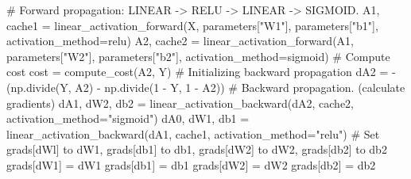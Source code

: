 \documentclass[
  letterpaper,
  DIV=11,
  numbers=noendperiod]{scrartcl}
\newenvironment{Shaded}{\begin{snugshade}}{\end{snugshade}}
\newcommand{\CommentTok}[1]{\textcolor[rgb]{0.37,0.37,0.37}{#1}}
\newcommand{\DecValTok}[1]{\textcolor[rgb]{0.68,0.00,0.00}{#1}}
\newcommand{\NormalTok}[1]{\textcolor[rgb]{0.00,0.23,0.31}{#1}}
\newcommand{\OperatorTok}[1]{\textcolor[rgb]{0.37,0.37,0.37}{#1}}
\newcommand{\StringTok}[1]{\textcolor[rgb]{0.13,0.47,0.30}{#1}}
\begin{document}
\begin{Shaded}
\begin{Highlighting}[]
        \CommentTok{\# Forward propagation: LINEAR {-}\textgreater{} RELU {-}\textgreater{} LINEAR {-}\textgreater{} SIGMOID.}
\NormalTok{        A1, cache1 }\OperatorTok{=}\NormalTok{ linear\_activation\_forward(X, parameters[}\StringTok{"W1"}\NormalTok{], parameters[}\StringTok{"b1"}\NormalTok{], activation\_method}\OperatorTok{=}\StringTok{\textquotesingle{}relu\textquotesingle{}}\NormalTok{)}
\NormalTok{        A2, cache2 }\OperatorTok{=}\NormalTok{ linear\_activation\_forward(A1, parameters[}\StringTok{"W2"}\NormalTok{], parameters[}\StringTok{"b2"}\NormalTok{], activation\_method}\OperatorTok{=}\StringTok{\textquotesingle{}sigmoid\textquotesingle{}}\NormalTok{)}
        \CommentTok{\# Compute cost}
\NormalTok{        cost }\OperatorTok{=}\NormalTok{ compute\_cost(A2, Y)}
        \CommentTok{\# Initializing backward propagation}
\NormalTok{        dA2 }\OperatorTok{=} \OperatorTok{{-}}\NormalTok{ (np.divide(Y, A2) }\OperatorTok{{-}}\NormalTok{ np.divide(}\DecValTok{1} \OperatorTok{{-}}\NormalTok{ Y, }\DecValTok{1} \OperatorTok{{-}}\NormalTok{ A2))}
        \CommentTok{\# Backward propagation. (calculate gradients)}
\NormalTok{        dA1, dW2, db2 }\OperatorTok{=}\NormalTok{ linear\_activation\_backward(dA2, cache2, activation\_method}\OperatorTok{=}\StringTok{"sigmoid"}\NormalTok{)}
\NormalTok{        dA0, dW1, db1 }\OperatorTok{=}\NormalTok{ linear\_activation\_backward(dA1, cache1, activation\_method}\OperatorTok{=}\StringTok{"relu"}\NormalTok{)}
        \CommentTok{\# Set grads[\textquotesingle{}dWl\textquotesingle{}] to dW1, grads[\textquotesingle{}db1\textquotesingle{}] to db1, grads[\textquotesingle{}dW2\textquotesingle{}] to dW2, grads[\textquotesingle{}db2\textquotesingle{}] to db2}
\NormalTok{        grads[}\StringTok{\textquotesingle{}dW1\textquotesingle{}}\NormalTok{] }\OperatorTok{=}\NormalTok{ dW1}
\NormalTok{        grads[}\StringTok{\textquotesingle{}db1\textquotesingle{}}\NormalTok{] }\OperatorTok{=}\NormalTok{ db1}
\NormalTok{        grads[}\StringTok{\textquotesingle{}dW2\textquotesingle{}}\NormalTok{] }\OperatorTok{=}\NormalTok{ dW2}
\NormalTok{        grads[}\StringTok{\textquotesingle{}db2\textquotesingle{}}\NormalTok{] }\OperatorTok{=}\NormalTok{ db2}
        

\end{Highlighting}
\end{Shaded}
\end{document}
